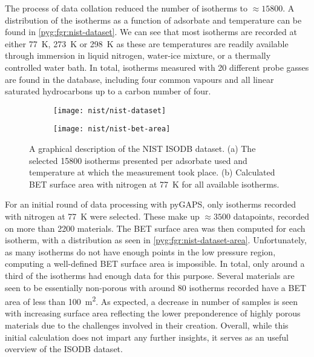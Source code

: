 The process of data collation reduced the number of isotherms
to \(\approx \! 15800\). A distribution of the isotherms as a 
function of adsorbate and temperature can be found 
in \autoref{pyg:fgr:nist-dataset}.
We can see that most isotherms are recorded at either 
\SI{77}{\kelvin}, \SI{273}{\kelvin} or \SI{298}{\kelvin} as 
these are temperatures are readily available through immersion
in liquid nitrogen, water-ice mixture, or a thermally controlled
water bath. In total, isotherms measured with 20 different 
probe gasses are found in the database, including four 
common vapours and all linear saturated hydrocarbons up 
to a carbon number of four. 

\begin{figure}[htb]
    \centering

    \begin{subfigure}[b]{0.5\linewidth}
        \texttt{[image: nist/nist-dataset]}%
        \caption{}%
        \label{pyg:fgr:nist-dataset}
    \end{subfigure}%
    \begin{subfigure}[b]{0.45\linewidth}
        \texttt{[image: nist/nist-bet-area]}%
        \caption{}%
        \label{pyg:fgr:nist-dataset-area}
    \end{subfigure}%

    \caption{A graphical description of the NIST ISODB dataset.
    (a) The selected 15800 isotherms presented per adsorbate used
    and temperature at which the measurement took place.
    (b) Calculated BET surface area with nitrogen at \SI{77}{\kelvin}
    for all available isotherms. }%
    \label{pyg:fgr:nist-set}
\end{figure}

For an initial round of data processing with pyGAPS,
only isotherms recorded with nitrogen at \SI{77}{\kelvin}
were selected. These make up \(\approx \! 3500\) datapoints,
recorded on more than 2200 materials. The BET surface area 
was then computed for each isotherm, with a distribution
as seen in \autoref{pyg:fgr:nist-dataset-area}.
Unfortunately, as many isotherms do not have enough points
in the low pressure region, computing a well-defined
BET surface area is impossible. In total, only around a
third of the isotherms had enough data for this purpose.
Several materials are seen to be essentially non-porous
with around 80 isotherms recorded have a BET area of less 
than \SI{100}{\metre^2}. As expected, a decrease in 
number of samples is seen with increasing surface area
reflecting the lower preponderence of highly porous 
materials due to the challenges involved in their 
creation. Overall, while this initial calculation does 
not impart any further insights, it serves as an useful overview
of the ISODB dataset.

